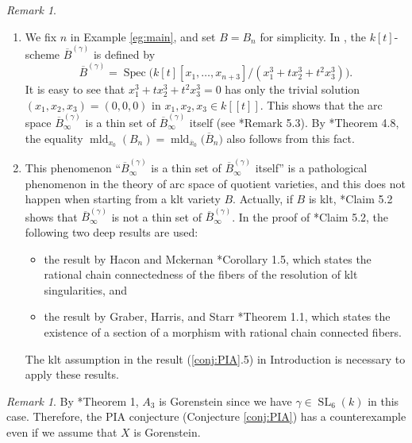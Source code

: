 \documentclass[a4paper,11pt]{amsart}
\theoremstyle{definition}
\theoremstyle{remark}
\newtheorem{rmk}[thm]{Remark}
\begin{document}
\begin{rmk}\label{rmk:thin}
\begin{enumerate}
\item
We fix $n$ in Example \ref{eg:main}, and set $B = B_n$ for simplicity. 
In \cite{NS22}, the $k[t]$-scheme $\overline{B}^{(\gamma)}$ is defined by 
\[
\overline{B}^{(\gamma)}
= \operatorname{Spec} \bigl( k[t][x_1, \ldots , x_{n+3}] / (x_1^3 + t x_2 ^3 + t^2 x_3 ^3) \bigr). 
\]
It is easy to see that $x_1^3 + t x_2 ^3 + t^2 x_3 ^3 = 0$ has only the trivial solution $(x_1, x_2, x_3) = (0,0,0)$ in $x_1, x_2, x_3 \in k[[t]]$. 
This shows that the arc space $\overline{B}^{(\gamma)}_{\infty}$ is a thin set of $\overline{B}^{(\gamma)}_{\infty}$ itself (see \cite{NS22}*{Remark 5.3}).  
By \cite{NS22}*{Theorem 4.8}, the equality $\operatorname{mld}_{x_0}(B_n) = \operatorname{mld}_{\overline{x}_0} \bigl( \overline{B}_n \bigr)$  also follows from this fact. 

\item
This phenomenon ``$\overline{B}^{(\gamma)}_{\infty}$ is a thin set of $\overline{B}^{(\gamma)}_{\infty}$ itself'' 
is a pathological phenomenon in the theory of arc space of quotient varieties, 
and this does not happen when starting from a klt variety $B$. 
Actually, if $B$ is klt, \cite{NS22}*{Claim 5.2} shows that $\overline{B}^{(\gamma)}_{\infty}$ is not a thin set of $\overline{B}^{(\gamma)}_{\infty}$. 
In the proof of \cite{NS22}*{Claim 5.2}, the following two deep results are used: 
\begin{itemize}
\item
the result by Hacon and Mckernan \cite{HM07}*{Corollary 1.5}, 
which states the rational chain connectedness of the fibers of the resolution of klt singularities, and 

\item
the result by Graber, Harris, and Starr \cite{GHS03}*{Theorem 1.1}, which states the existence of a section of a morphism with rational chain connected fibers. 
\end{itemize}
The klt assumption in the result (\ref{conj:PIA}.5) in Introduction is necessary to apply these results. 
\end{enumerate}
\end{rmk}

\begin{rmk}
By \cite{Wat74}*{Theorem 1}, $A_3$ is Gorenstein since we have $\gamma \in \operatorname{SL}_6(k)$ in this case. 
Therefore, the PIA conjecture (Conjecture \ref{conj:PIA}) has a counterexample even if we assume that $X$ is Gorenstein. 
\end{rmk}
\end{document}
